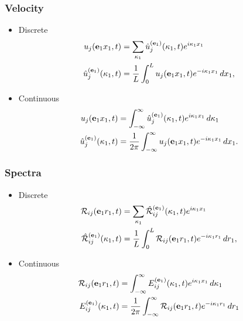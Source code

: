 \documentclass[oneside,a4paper,11pt]{report}
\newcommand{\tpvc}{\mathcal{R}} %
\newcommand{\est}{E}            %
\newcommand{\ujfluc}{u_j}
\begin{document}
\subsubsection{Velocity}
\begin{itemize}
\item Discrete
\begin{align}
\ujfluc(\evec_1 x_1,t) &= \sum_{\kappa_1} \hat{u}^{(\evec_1)}_j(\kappa_1,t) e^{i \kappa_1 x_1}\\
\hat{u}^{(\evec_1)}_j(\kappa_1,t) &= \frac{1}{L} \int_0^L \ujfluc(\evec_1 x_1,t) e^{-i \kappa_1 x_1} \, dx_1,
\end{align}
\item Continuous
\begin{align}
\ujfluc(\evec_1 x_1,t) &= \int_{-\infty}^{\infty} \hat{u}^{(\evec_1)}_j(\kappa_1,t) e^{i \kappa_1 x_1} \, d\kappa_1 \\
\hat{u}^{(\evec_1)}_j(\kappa_1,t) &= \frac{1}{2\pi} \int_{-\infty}^{\infty} \ujfluc(\evec_1 x_1,t) e^{-i \kappa_1 x_1} \, dx_1.
\end{align}
\end{itemize}

\subsubsection{Spectra}
\begin{itemize}
\item Discrete
\begin{align}
\tpvc_{ij}(\evec_1 r_1, t) &= \sum_{\kappa_1} \hat{\tpvc}_{ij}^{(\evec_1)}(\kappa_1,t) e^{i \kappa_1 x_1} \\
\hat{\tpvc}_{ij}^{(\evec_1)}(\kappa_1,t) &= \frac{1}{L} \int_0^L \tpvc_{ij} (\evec_1 r_1, t) e^{-i\kappa_1 r_1} \, dr_1,
\end{align}
\item Continuous
\begin{align}
\tpvc_{ij}(\evec_1 r_1, t) &= \int_{-\infty}^{\infty} \est_{ij}^{(\evec_1)}(\kappa_1,t) e^{i \kappa_1 x_1} \, d\kappa_1 \\
\est_{ij}^{(\evec_1)}(\kappa_1,t) &=  \frac{1}{2 \pi} \int_{-\infty}^{\infty} \tpvc_{ij}(\evec_1 r_1,t) e^{-i \kappa_1 r_1} \, d r_1
\end{align}
\end{itemize}
\end{document}
